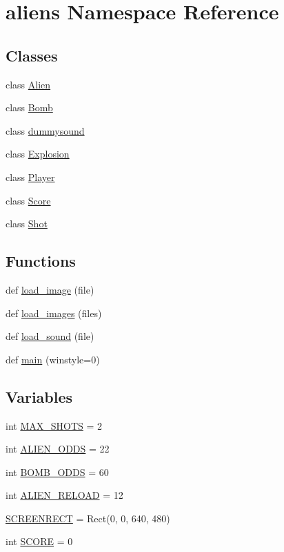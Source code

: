 \hypertarget{namespacealiens}{}\section{aliens Namespace Reference}
\label{namespacealiens}
\subsection*{Classes}
\begin{DoxyCompactItemize}
\item 
class \hyperlink{classaliens_1_1_alien}{Alien}
\item 
class \hyperlink{classaliens_1_1_bomb}{Bomb}
\item 
class \hyperlink{classaliens_1_1dummysound}{dummysound}
\item 
class \hyperlink{classaliens_1_1_explosion}{Explosion}
\item 
class \hyperlink{classaliens_1_1_player}{Player}
\item 
class \hyperlink{classaliens_1_1_score}{Score}
\item 
class \hyperlink{classaliens_1_1_shot}{Shot}
\end{DoxyCompactItemize}
\subsection*{Functions}
\begin{DoxyCompactItemize}
\item 
def \hyperlink{namespacealiens_afd3fe81cae5b9e9518034c5a41b31e49}{load\+\_\+image} (file)
\item 
def \hyperlink{namespacealiens_aa5cbe942057d524e9d5c469c5e121b69}{load\+\_\+images} (files)
\item 
def \hyperlink{namespacealiens_ab0f50ede8108ffa183811f5137a277a5}{load\+\_\+sound} (file)
\item 
def \hyperlink{namespacealiens_a9fa9246c75151e1ea7a030cda205948c}{main} (winstyle=0)
\end{DoxyCompactItemize}
\subsection*{Variables}
\begin{DoxyCompactItemize}
\item 
int \hyperlink{namespacealiens_a1104a25a67f7d483e1ef620a96dff020}{M\+A\+X\+\_\+\+S\+H\+O\+TS} = 2
\item 
int \hyperlink{namespacealiens_ae544455bab3304b7a45f1ff8e27992ae}{A\+L\+I\+E\+N\+\_\+\+O\+D\+DS} = 22
\item 
int \hyperlink{namespacealiens_a69424d7afa47dbc8011863b8165b81b1}{B\+O\+M\+B\+\_\+\+O\+D\+DS} = 60
\item 
int \hyperlink{namespacealiens_ab1744b15505d27c1bb5b3381d5e82706}{A\+L\+I\+E\+N\+\_\+\+R\+E\+L\+O\+AD} = 12
\item 
\hyperlink{namespacealiens_a3aea54ac6601800e3cf83cc8e2edac8d}{S\+C\+R\+E\+E\+N\+R\+E\+CT} = Rect(0, 0, 640, 480)
\item 
int \hyperlink{namespacealiens_a22027e245c7a5d33d0cfa6d88ea81909}{S\+C\+O\+RE} = 0
\end{DoxyCompactItemize}


